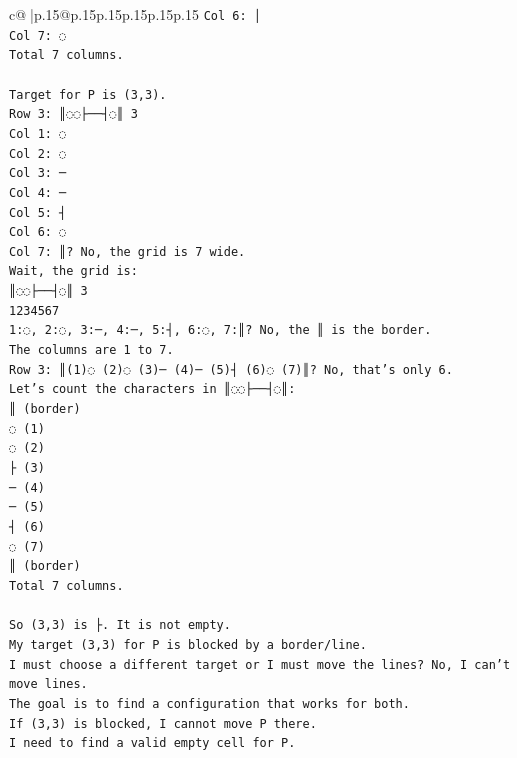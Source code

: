 \documentclass{article}
\begin{document}
{\begin{supertabular}{c@{$\;$}|p{.15\linewidth}@{}p{.15\linewidth}p{.15\linewidth}p{.15\linewidth}p{.15\linewidth}p{.15\linewidth}}
{{{\texttt{Col 6: │} \\
\texttt{Col 7: ◌} \\
\texttt{Total 7 columns.} \\
\\ 
\texttt{Target for P is (3,3).} \\
\texttt{Row 3: ║◌◌├──┤◌║ 3} \\
\texttt{Col 1: ◌} \\
\texttt{Col 2: ◌} \\
\texttt{Col 3: ─} \\
\texttt{Col 4: ─} \\
\texttt{Col 5: ┤} \\
\texttt{Col 6: ◌} \\
\texttt{Col 7: ║? No, the grid is 7 wide.} \\
\texttt{Wait, the grid is:} \\
\texttt{║◌◌├──┤◌║ 3} \\
\texttt{1234567} \\
\texttt{1:◌, 2:◌, 3:─, 4:─, 5:┤, 6:◌, 7:║? No, the ║ is the border.} \\
\texttt{The columns are 1 to 7.} \\
\texttt{Row 3: ║(1)◌ (2)◌ (3)─ (4)─ (5)┤ (6)◌ (7)║? No, that's only 6.} \\
\texttt{Let's count the characters in ║◌◌├──┤◌║:} \\
\texttt{║ (border)} \\
\texttt{◌ (1)} \\
\texttt{◌ (2)} \\
\texttt{├ (3)} \\
\texttt{─ (4)} \\
\texttt{─ (5)} \\
\texttt{┤ (6)} \\
\texttt{◌ (7)} \\
\texttt{║ (border)} \\
\texttt{Total 7 columns.} \\
\\ 
\texttt{So (3,3) is ├. It is not empty.} \\
\texttt{My target (3,3) for P is blocked by a border/line.} \\
\texttt{I must choose a different target or I must move the lines? No, I can't move lines.} \\
\texttt{The goal is to find a configuration that works for both.} \\
\texttt{If (3,3) is blocked, I cannot move P there.} \\
\texttt{I need to find a valid empty cell for P.} \\
}}}
\end{supertabular}}
\end{document}
